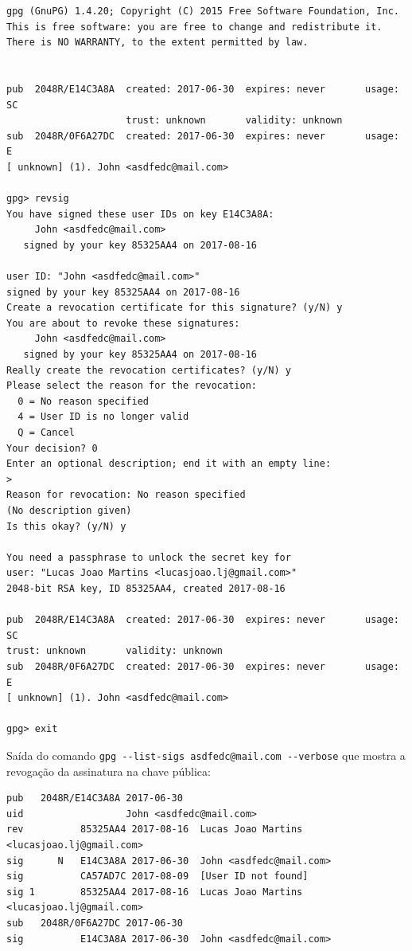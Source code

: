 \documentclass[12pt]{article}
\begin{document}
\begin{lstlisting}
gpg (GnuPG) 1.4.20; Copyright (C) 2015 Free Software Foundation, Inc.
This is free software: you are free to change and redistribute it.
There is NO WARRANTY, to the extent permitted by law.


pub  2048R/E14C3A8A  created: 2017-06-30  expires: never       usage: SC
                     trust: unknown       validity: unknown
sub  2048R/0F6A27DC  created: 2017-06-30  expires: never       usage: E
[ unknown] (1). John <asdfedc@mail.com>

gpg> revsig
You have signed these user IDs on key E14C3A8A:
     John <asdfedc@mail.com>
   signed by your key 85325AA4 on 2017-08-16

user ID: "John <asdfedc@mail.com>"
signed by your key 85325AA4 on 2017-08-16
Create a revocation certificate for this signature? (y/N) y
You are about to revoke these signatures:
     John <asdfedc@mail.com>
   signed by your key 85325AA4 on 2017-08-16
Really create the revocation certificates? (y/N) y
Please select the reason for the revocation:
  0 = No reason specified
  4 = User ID is no longer valid
  Q = Cancel
Your decision? 0
Enter an optional description; end it with an empty line:
>
Reason for revocation: No reason specified
(No description given)
Is this okay? (y/N) y

You need a passphrase to unlock the secret key for
user: "Lucas Joao Martins <lucasjoao.lj@gmail.com>"
2048-bit RSA key, ID 85325AA4, created 2017-08-16

pub  2048R/E14C3A8A  created: 2017-06-30  expires: never       usage: SC
trust: unknown       validity: unknown
sub  2048R/0F6A27DC  created: 2017-06-30  expires: never       usage: E
[ unknown] (1). John <asdfedc@mail.com>

gpg> exit
\end{lstlisting}

Saída do comando \lstinline{gpg --list-sigs asdfedc@mail.com --verbose} que mostra a revogação da assinatura na chave pública:

\begin{lstlisting}
pub   2048R/E14C3A8A 2017-06-30
uid                  John <asdfedc@mail.com>
rev          85325AA4 2017-08-16  Lucas Joao Martins <lucasjoao.lj@gmail.com>
sig      N   E14C3A8A 2017-06-30  John <asdfedc@mail.com>
sig          CA57AD7C 2017-08-09  [User ID not found]
sig 1        85325AA4 2017-08-16  Lucas Joao Martins <lucasjoao.lj@gmail.com>
sub   2048R/0F6A27DC 2017-06-30
sig          E14C3A8A 2017-06-30  John <asdfedc@mail.com>
\end{lstlisting}
\end{document}
